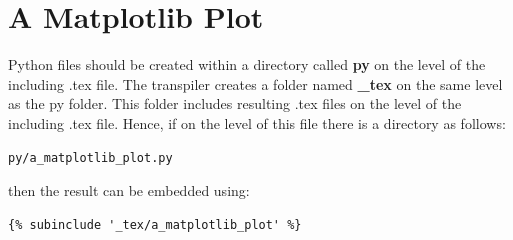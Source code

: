 \documentclass[a4paper]{book}
\begin{document}
\section{A Matplotlib Plot}
\label{sec:a-matplotlib-plot}
Python files should be created within a directory called \textbf{py} on the level of the including .tex file. The transpiler creates a folder named \textbf{\_tex} on the same level as the py folder. This folder includes resulting .tex files on the level of the including .tex file. Hence, if on the level of this file there is a directory as follows:
\begin{verbatim}
py/a_matplotlib_plot.py
\end{verbatim}
then the result can be embedded using:
\begin{verbatim}
{% subinclude '_tex/a_matplotlib_plot' %}
\end{verbatim}
\end{document}
